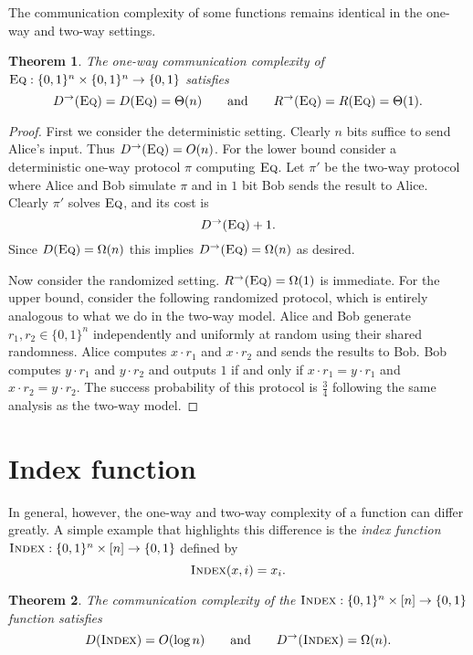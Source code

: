 \documentclass[11pt]{amsart}
\theoremstyle{plain}
\newtheorem{theorem}{Theorem}
\theoremstyle{definition}
\theoremstyle{plain}
\newcommand{\Eq}{\textsc{Eq}}
\newcommand{\Index}{\textsc{Index}}
\begin{document}
The communication complexity of some functions remains identical in the one-way and two-way settings.

\begin{theorem}
The one-way communication complexity of $\Eq : \{0,1\}^n \times \{0,1\}^n \to \{0,1\}$ satisfies
\[
D^\rightarrow(\Eq) = D(\Eq) = \Theta(n) \qquad \mbox{and} \qquad 
R^\rightarrow(\Eq) = R(\Eq) = \Theta(1).
\]
\end{theorem}

\begin{proof}
	
First we consider the deterministic setting. Clearly $n$ bits suffice to send Alice's input. Thus $D^\rightarrow(\Eq) = O(n)$. For the lower bound consider a deterministic one-way protocol $\pi$ computing $\Eq$. Let $\pi'$ be the two-way protocol where Alice and Bob simulate $\pi$ and in $1$ bit Bob sends the result to Alice. Clearly $\pi'$ solves $\Eq$, and its cost is
$$D^\rightarrow(\Eq) + 1.$$
Since $D(\Eq) = \Omega(n)$ this implies $D^\rightarrow(\Eq) = \Omega(n)$ as desired.

Now consider the randomized setting. $R^\rightarrow(\Eq) = \Omega(1)$ is immediate. For the upper bound, consider the following randomized protocol, which is entirely analogous to what we do in the two-way model. Alice and Bob generate $r_1, r_2 \in \{0,1\}^n$ independently and uniformly at random using their shared randomness. Alice computes $x\cdot r_1$ and $x\cdot r_2$ and sends the results to Bob. Bob computes $y\cdot r_1$ and $y\cdot r_2$ and outputs $1$ if and only if $x\cdot r_1 = y\cdot r_1$ and $x\cdot r_2 = y\cdot r_2$. The success probability of this protocol is $\frac{3}{4}$ following the same analysis as the two-way model.

\end{proof}


\newpage 
\section{Index function}

In general, however, the one-way and two-way complexity of a function can differ greatly. A simple example that highlights this difference is the \emph{index function} $\Index : \{0,1\}^n \times [n] \to \{0,1\}$ defined by
\[
\Index(x,i) = x_i.
\]

\begin{theorem}
The communication complexity of the $\Index : \{0,1\}^n \times [n] \to \{0,1\}$ function satisfies
\[
D(\Index) = O(\log n) \qquad \mbox{and} \qquad D^\rightarrow(\Index) = \Omega(n).
\]
\end{theorem}
\end{document}
